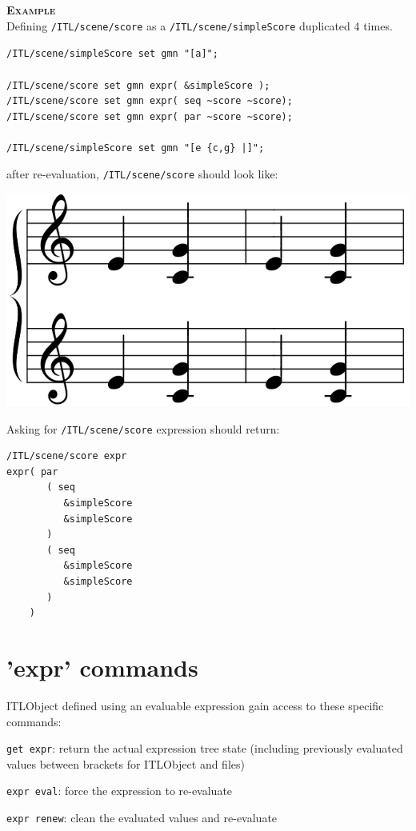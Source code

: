 \documentclass[a4paper,twoside]{report}
\newcommand{\sublevel}[1]	{\section{#1}}
\newcommand{\OSC}[1]		{\texttt{#1}}
\newcommand{\example}		{\textbf{\hspace{-1.5cm}\textbf{\textsc{Example }}}}
\newcommand{\lowTilde} 		{\textasciitilde}
\let\olditemize\itemize
\let\oldenditemize\enditemize
\renewenvironment{itemize} 	{\olditemize \setlength{\itemsep}{1mm}}{\oldenditemize}
\newcommand{\sample}	[1]			{\vspace{-2mm}\begin{center}\colorbox{mygrey}{
								\begin{minipage}[t]{0.9\columnwidth} 
								{\small \texttt{#1}}
								\end{minipage}}\end{center}}
\begin{document}
\example\\
Defining \OSC{/ITL/scene/score} as a \OSC{/ITL/scene/simpleScore} duplicated 4 times.
\sample{/ITL/scene/simpleScore set gmn "[a]";\\
\\
/ITL/scene/score set gmn expr( \&simpleScore );\\
/ITL/scene/score set gmn expr( seq \lowTilde score \lowTilde score);\\
/ITL/scene/score set gmn expr( par \lowTilde score \lowTilde score);\\
\\
/ITL/scene/simpleScore set gmn "[e \{c,g\} |]";
}
after re-evaluation, \OSC{/ITL/scene/score} should look like:\\
\begin{center}
 \includegraphics[scale=0.3]{imgs/seqparEnhanced}
\end{center}

Asking for \OSC{/ITL/scene/score} expression should return:

\begin{verbatim}
/ITL/scene/score expr
expr( par
       ( seq
          &simpleScore
          &simpleScore
       )
       ( seq
          &simpleScore
          &simpleScore
       )
    )
\end{verbatim}



\sublevel{'expr' commands}

ITLObject defined using an evaluable expression gain access to these specific commands:

\begin{itemize}
\item \OSC{get expr}: return the actual expression tree state (including previously evaluated values between brackets for ITLObject and files)
\item \OSC{expr eval}: force the expression to re-evaluate
\item \OSC{expr renew}: clean the evaluated values and re-evaluate
\end{itemize}
\end{document}
